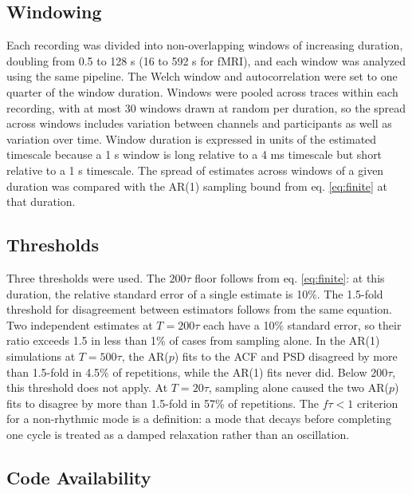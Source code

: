 \documentclass[pdflatex,lineno,sn-nature]{sn-jnl}
\theoremstyle{thmstyleone}
\theoremstyle{thmstyletwo}
\theoremstyle{thmstylethree}
\begin{document}
\subsection{Windowing}

Each recording was divided into non-overlapping windows of increasing duration, doubling from 0.5 to 128 s (16 to 592 s for fMRI), and each window was analyzed using the same pipeline. The Welch window and autocorrelation were set to one quarter of the window duration. Windows were pooled across traces within each recording, with at most 30 windows drawn at random per duration, so the spread across windows includes variation between channels and participants as well as variation over time. Window duration is expressed in units of the estimated timescale because a 1 s window is long relative to a 4 ms timescale but short relative to a 1 s timescale. The spread of estimates across windows of a given duration was compared with the AR(1) sampling bound from eq. \ref{eq:finite} at that duration.

\subsection{Thresholds}

Three thresholds were used. The $200\tau$ floor follows from eq. \ref{eq:finite}: at this duration, the relative standard error of a single estimate is 10\%. The 1.5-fold threshold for disagreement between estimators follows from the same equation. Two independent estimates at $T = 200\tau$ each have a 10\% standard error, so their ratio exceeds 1.5 in less than 1\% of cases from sampling alone. In the AR(1) simulations at $T = 500\tau$, the AR($p$) fits to the ACF and PSD disagreed by more than 1.5-fold in 4.5\% of repetitions, while the AR(1) fits never did. Below $200\tau$, this threshold does not apply. At $T = 20\tau$, sampling alone caused the two AR($p$) fits to disagree by more than 1.5-fold in 57\% of repetitions. The $f\tau < 1$ criterion for a non-rhythmic mode is a definition: a mode that decays before completing one cycle is treated as a damped relaxation rather than an oscillation.

\subsection{Code Availability}
\end{document}
